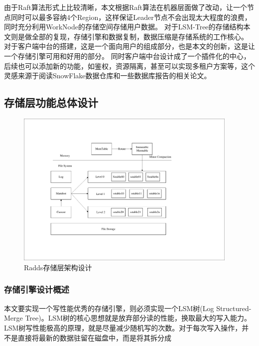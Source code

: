 \begin{enumerate}[fullwidth,itemindent=2em,listparindent=2em]
			由于Raft算法形式上比较清晰，本文根据Raft算法在机器层面做了改动，让一个节点同时可以最多容纳4个Region，这样保证Leader节点不会出现太大程度的浪费，
			同时充分利用WorkNode的存储空间存储用户数据。
			对于LSM-Tree的存储结构本文则是做全部的复现，存储引擎和数据复制，数据压缩是存储系统的工作核心。
			对于客户端中台的搭建，这是一个面向用户的组成部分，也是本文的创新，这是让一个存储引擎可用和好用的部分。
			同时客户端中台设计成了一个插件化的中心，后续也可以添加新的功能，如鉴权，资源隔离，甚至可以实现多租户方案等，这个灵感来源于阅读SnowFlake数据仓库和一些数据库报告的相关论文。
	
		\end{enumerate}
		

		  
	\subsection{存储层功能总体设计}
			
	\begin{figure}[H]
		\centering
		\includegraphics[width=0.95\textwidth]{pdf/leveldb_arch.pdf}
		\caption{Radds存储层架构设计}
		\label{mobile_overall_design}
	\end{figure}


		\subsubsection{存储引擎设计概述}
		
		本文要实现一个写性能优秀的存储引擎，则必须实现一个LSM树(Log Structured-Merge Tree)。LSM树的核心思想就是放弃部分读的性能，换取最大的写入能力。
		LSM树写性能极高的原理，就是尽量减少随机写的次数。对于每次写入操作，并不是直接将最新的数据驻留在磁盘中，而是将其拆分成
		
